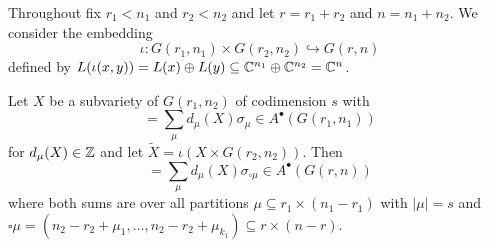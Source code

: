 Throughout fix $r_1 < n_1$ and $r_2 < n_2$ and let $r = r_1 + r_2$ and $n = n_1 + n_2$. We consider the embedding 
\begin{equation*}
    \iota \colon G(r_1,n_1) \times G(r_2,n_2) \hookrightarrow G(r,n)
\end{equation*}
defined by $L(\iota(x,y)) = L(x) \oplus L(y) \subseteq {\mathbb C}^{n_1} \oplus {\mathbb C}^{n_2} = {\mathbb C}^n$.

\begin{lemma}
    \label{lem:varietyLift}
    Let $X$ be a subvariety of $G(r_1,n_2)$ of codimension $s$ with
    \begin{equation*}
        [X] = \sum_\mu d_\mu(X) \sigma_\mu \in A^\bullet(G(r_1,n_1))
    \end{equation*}
    for $d_\mu(X) \in {\mathbb Z}$ and let $\tilde{X} = \iota(X \times G(r_2,n_2))$. Then
    \begin{equation*}
        [\tilde{X}] = \sum_\mu d_\mu(X) \sigma_{\square \mu} \in A^\bullet(G(r,n))
    \end{equation*}
    where both sums are over all partitions $\mu \subseteq r_1 \times (n_1-r_1)$ with $|\mu| = s$ and $\square \mu = (n_2-r_2 + \mu_1, \dots, n_2-r_2 + \mu_{k_1}) \subseteq r\times (n-r)$.
\end{lemma}
